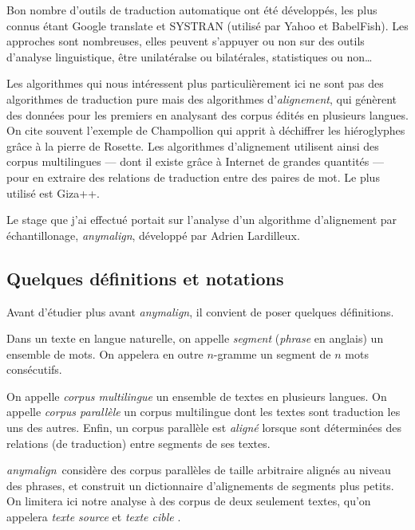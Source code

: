 \documentclass[a4paper,10pt]{article}
\newcommand{\anym}{\emph{anymalign}}
\begin{document}
Bon nombre d'outils de traduction automatique ont été développés, les plus connus étant Google translate et SYSTRAN (utilisé par Yahoo et BabelFish). Les approches sont nombreuses, elles peuvent s'appuyer ou non sur des outils d'analyse linguistique, être unilatéralse ou bilatérales, statistiques ou non\dots

Les algorithmes qui nous intéressent plus particulièrement ici ne sont pas des algorithmes de traduction pure mais des algorithmes d'\emph{alignement}, qui génèrent des données pour les premiers en analysant des corpus édités en plusieurs langues. On cite souvent l'exemple de Champollion qui apprit à déchiffrer les hiéroglyphes grâce à la pierre de Rosette. Les algorithmes d'alignement utilisent ainsi des corpus multilingues --- dont il existe grâce à Internet de grandes quantités --- pour en extraire des relations de traduction entre des paires de mot. Le plus utilisé est Giza++.



Le stage que j'ai effectué portait sur l'analyse d'un algorithme d'alignement par échantillonage, \anym, développé par Adrien Lardilleux.


\subsection{Quelques définitions et notations}

Avant d'étudier plus avant \anym, il convient de poser quelques définitions.

Dans un texte en langue naturelle, on appelle \emph{segment} (\emph{phrase} en anglais) un ensemble de mots. On appelera en outre $n$-gramme un segment de $n$ mots consécutifs.

On appelle \emph{corpus multilingue} un ensemble de textes en plusieurs langues. On appelle \emph{corpus parallèle} un corpus multilingue dont les textes sont traduction les uns des autres. Enfin, un corpus parallèle est \emph{aligné} lorsque sont déterminées des relations (de traduction) entre segments de ses textes.

\anym~considère des corpus parallèles de taille arbitraire alignés au niveau des phrases, et construit un dictionnaire d'alignements de segments plus petits. On limitera ici notre analyse à des corpus de deux seulement textes, qu'on appelera \emph{texte source} et \emph{texte cible}
.
\end{document}
